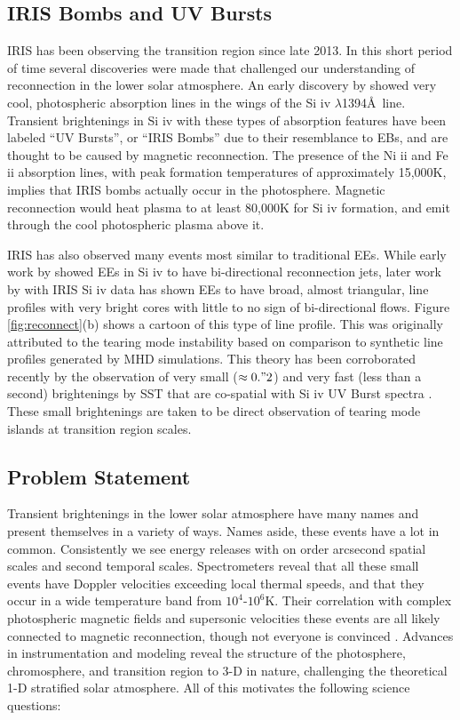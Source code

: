 \documentclass[]{aastex6}
\begin{document}
	\subsection{IRIS Bombs and UV Bursts}
	IRIS has been observing the transition region since late 2013.  In this short period of time several discoveries were made that challenged our understanding of reconnection in the lower solar atmosphere.  An early discovery by \citet{Peter2014} showed very cool, photospheric absorption lines in the wings of the Si {\sc iv} $\lambda$1394\AA\ line. Transient brightenings in Si {\sc iv} with these types of absorption features have been labeled ``UV Bursts'', or  ``IRIS Bombs'' due to their resemblance to EBs, and are thought to be caused by magnetic reconnection. The presence of the Ni {\sc ii} and Fe {\sc ii} absorption lines, with peak formation temperatures of approximately 15,000K, implies that IRIS bombs actually occur in the photosphere.  Magnetic reconnection would heat plasma to at least 80,000K for Si {\sc iv} formation, and emit through the cool photospheric plasma above it.
	
	IRIS has also observed many events most similar to traditional EEs.  While early work by \citet{Innes1997} showed EEs in Si {\sc iv} to have bi-directional reconnection jets, later work by \citet{Innes2015} with IRIS Si {\sc iv} data has shown EEs to have broad, almost triangular, line profiles with very bright cores with little to no sign of bi-directional flows.  Figure \ref{fig:reconnect}(b) shows a cartoon of this type of line profile.  This was originally attributed to the tearing mode instability based on comparison to synthetic line profiles generated by MHD simulations. This theory has been corroborated recently by the observation of very small ($\approx 0."2$) and very fast (less than a second) brightenings by SST that are co-spatial with Si {\sc iv} UV Burst spectra \citep{Rouppe2017}.  These small brightenings are taken to be direct observation of tearing mode islands at transition region scales.
	
	
	
	\subsection{Problem Statement} 
	Transient brightenings in the lower solar atmosphere have many names and present themselves in a variety of ways. Names aside, these events have a lot in common.  Consistently we see energy releases with on order arcsecond spatial scales and second temporal scales. Spectrometers reveal that all these small events have Doppler velocities exceeding local thermal speeds, and that they occur in a wide temperature band from $10^4$-$10^6$K.  Their correlation with complex photospheric magnetic fields and supersonic velocities these events are all likely connected to magnetic reconnection, though not everyone is convinced \citep{Judge2015}. Advances in instrumentation and modeling reveal the structure of the photosphere, chromosphere, and transition region to 3-D in nature, challenging the theoretical 1-D stratified solar atmosphere.  All of this motivates the following science questions:
	
\end{document}
